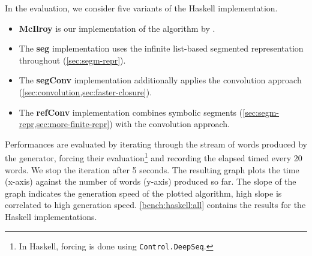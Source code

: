 In the evaluation, we consider five variants of the Haskell implementation.
\begin{itemize}
\item \textbf{McIlroy} is our implementation of
  the algorithm by \citet{DBLP:journals/jfp/McIlroy99}.
\item The \textbf{seg} implementation uses the infinite list-based segmented
  representation throughout (\cref{sec:segm-repr}).
\item The \textbf{segConv} implementation additionally
  applies the convolution approach (\cref{sec:convolution,sec:faster-closure}).
\item The \textbf{refConv} implementation combines
   symbolic segments (\cref{sec:segm-repr,sec:more-finite-repr}) with the convolution approach.
\end{itemize}

Performances are evaluated by iterating through the stream of words
produced by the generator, forcing their evaluation\footnote{In
  Haskell, forcing is done using \lstinline{Control.DeepSeq}.}
and recording the elapsed timed every 20 words.
We stop the iteration after 5 seconds.
The resulting graph plots the time (x-axis) against the number of words (y-axis) produced so far. The slope of the graph indicates the generation speed of the plotted algorithm, high slope is correlated to high generation speed.  \cref{bench:haskell:all} contains the results for the Haskell implementations.
 
